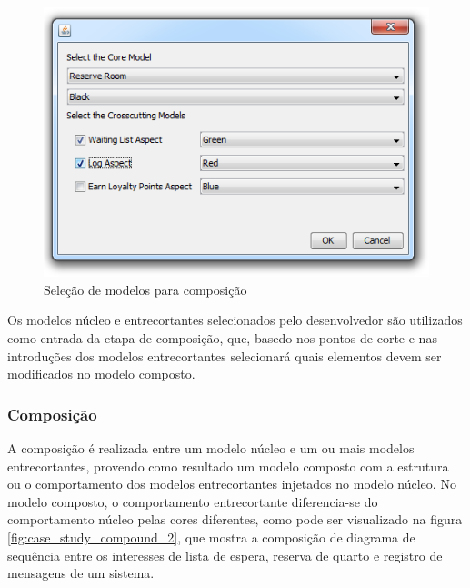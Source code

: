   \begin{figure}[!h]
	\centering
	\includegraphics{img/selection_screen.png}
	\caption{Seleção de modelos para composição}\label{fig:selection_screen}
  \end{figure}
  
Os modelos núcleo e entrecortantes selecionados pelo desenvolvedor são utilizados como entrada da etapa de composição, que, basedo nos pontos de corte
e nas introduções dos modelos entrecortantes selecionará quais elementos devem ser modificados no modelo composto.  

\subsubsection{Composição}

A composição é realizada entre um modelo núcleo e um ou mais modelos entrecortantes, provendo como resultado um modelo composto com a estrutura ou o
comportamento dos modelos entrecortantes injetados no modelo núcleo. No modelo composto, o comportamento entrecortante diferencia-se do comportamento
núcleo pelas cores diferentes, como pode ser visualizado na figura \ref{fig:case_study_compound_2}, que mostra a composição de diagrama de
sequência entre os interesses de lista de espera, reserva de quarto e registro de mensagens de um sistema.

